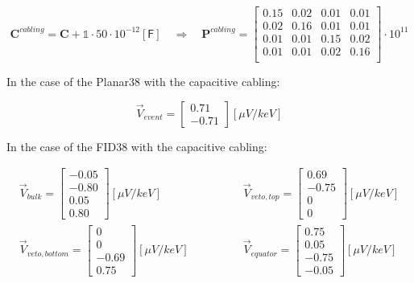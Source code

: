 \begin{equation}
\bm{C}^{cabling} = \bm{C} + \mathbb{1} \cdot 50 \cdot 10^{-12} [\textsf{F}]
\quad \Rightarrow \quad
\bm{P}^{cabling} = 
\begin{bmatrix}
  0.15 & 0.02 & 0.01 & 0.01\\
  0.02 & 0.16 & 0.01 & 0.01\\
  0.01 & 0.01 & 0.15 & 0.02\\
  0.01 & 0.01 & 0.02 & 0.16\\
\end{bmatrix}
\cdot 10^{11}
\end{equation}

In the case of the Planar38 with the capacitive cabling:

\begin{equation}
\vec{V}_{event}
=
\begin{bmatrix}
0.71 \\
-0.71
\end{bmatrix}
[\mu V/keV]
\end{equation}


In the case of the FID38 with the capacitive cabling:

\begin{equation}
\begin{array}{rr}
\vec{V}_{bulk}
=
\begin{bmatrix}
-0.05 \\ -0.80 \\ 0.05 \\ 0.80
\end{bmatrix}
[\mu V/keV]
\quad \quad
&
\quad \quad
\vec{V}_{veto,top}
=
\begin{bmatrix}
0.69 \\ -0.75 \\ 0 \\ 0
\end{bmatrix}
[\mu V/keV]
\\
\vec{V}_{veto,bottom}
=
\begin{bmatrix}
0 \\ 0 \\ -0.69 \\ 0.75
\end{bmatrix}
[\mu V/keV]
\quad \quad
&
\quad \quad
\vec{V}_{equator}
=
\begin{bmatrix}
0.75 \\ 0.05 \\ -0.75 \\ -0.05
\end{bmatrix}
[\mu V/keV]
\end{array}
\end{equation}

